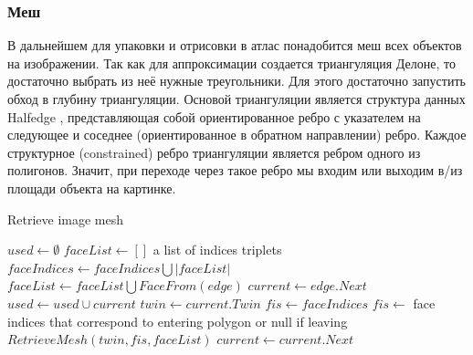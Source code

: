\documentclass{fefu_thesis/cls/fefu}
\newenvironment{algo}[1][]
  {\begin{algorithm}[#1]
     \selectlanguage{english}
     \floatname{algorithm}{Алгоритм}
  }
  {\end{algorithm}}
\begin{document}
    \subsubsection{Меш}
    В дальнейшем для упаковки и отрисовки в атлас понадобится меш всех объектов на изображении. Так как для аппроксимации создается триангуляция Делоне, то достаточно выбрать из неё нужные треугольники. Для этого достаточно запустить обход в глубину триангуляции. Основой триангуляции является структура данных Halfedge \cite{Halfedge}, представляющая собой ориентированное ребро с указателем на следующее и соседнее (ориентированное в обратном направлении) ребро. Каждое структурное (constrained) ребро триангуляции является ребром одного из полигонов. Значит, при переходе через такое ребро мы входим или выходим в/из площади объекта на картинке.

    \begin{algo}[H]
        \caption{Retrieve image mesh}
        \begin{algorithmic}[1]
            \State $used \gets \emptyset$
            \State $faceList \gets []$ a list of indices triplets
                 
                    \State $faceIndices \gets faceIndices \bigcup \left|faceList\right|$
                    \State $faceList \gets faceList \bigcup FaceFrom\left(edge\right)$
                \EndIf
                \State $current \gets edge.Next$
                 
                        \State $used \gets used \cup current$
                        \State $twin \gets current.Twin$
                        \State $fis \gets faceIndices$
                         
                            \State $fis \gets $ face indices that correspond to entering polygon or null if leaving
                        \EndIf
                        \State $RetrieveMesh(twin, fis, faceList)$
                    \EndIf
                \EndWhile
                \State $current \gets current.Next$
            \EndProcedure
        \end{algorithmic}
    \end{algo}
\end{document}
